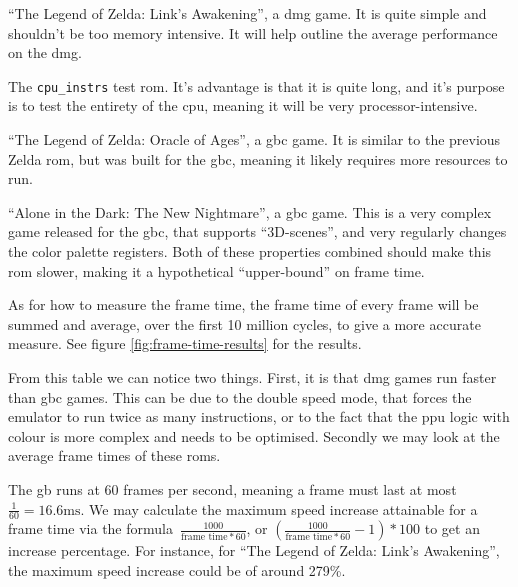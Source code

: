 \documentclass[11pt]{informatics-report}
\begin{document}
\begin{compactitem}
	\item ``The Legend of Zelda: Link's Awakening'', a \gls{dmg} game. It is quite simple and shouldn't be too memory intensive. It will help outline the average performance on the \gls{dmg}.
	\item The \texttt{cpu\_instrs} test \gls{rom}. It's advantage is that it is quite long, and it's purpose is to test the entirety of the \gls{cpu}, meaning it will be very processor-intensive.
	\item ``The Legend of Zelda: Oracle of Ages'', a \gls{gbc} game. It is similar to the previous Zelda \gls{rom}, but was built for the \gls{gbc}, meaning it likely requires more resources to run.
	\item ``Alone in the Dark: The New Nightmare'', a \gls{gbc} game. This is a very complex game released for the \gls{gbc}, that supports ``3D-scenes'', and very regularly changes the color palette registers\cite[Tricky-to-emulate games]{gbdev_wiki}. Both of these properties combined should make this \gls{rom} slower, making it a hypothetical ``upper-bound'' on frame time.
\end{compactitem}

As for how to measure the frame time, the frame time of every frame will be summed and average, over the first 10 million cycles, to give a more accurate measure. See figure \ref{fig:frame-time-results} for the results.

From this table we can notice two things. First, it is that \gls{dmg} games run faster than \gls{gbc} games. This can be due to the double speed mode, that forces the emulator to run twice as many instructions, or to the fact that the \gls{ppu} logic with colour is more complex and needs to be optimised. Secondly we may look at the average frame times of these \glspl{rom}. 

The \gls{gb} runs at 60 frames per second, meaning a frame must last at most $\frac{1}{60}=16.6\text{ms}$. We may calculate the maximum speed increase attainable for a frame time via the formula~$\frac{1000}{\text{frame time} * 60}$, or $(\frac{1000}{\text{frame time} * 60}-1)*100$ to get an increase percentage. For instance, for ``The Legend of Zelda: Link's Awakening'', the maximum speed increase could be of around 279\%.
\end{document}
